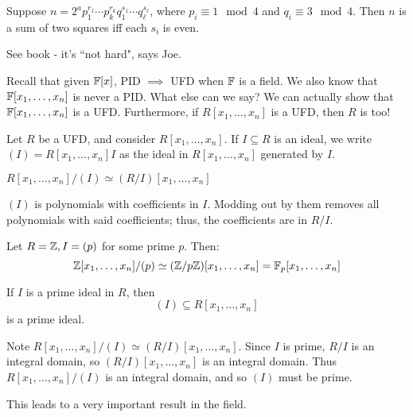 \begin{thm}
    Suppose $ n = 2^{a}p_{1}^{r_{1}}\cdots p_{k}^{r_{k}}q_{1}^{s_{1}}\cdots q_{\ell}^{s_{\ell}} $,
    where $ p_{i} \equiv 1 \mod 4 $ and $ q_{i} \equiv 3 \mod 4 $.
    Then $ n $ is a sum of two squares iff each $ s_{i} $ is even.
\end{thm}

\begin{pf}[source=Primary Source Material]
    See book - it's ``not hard", says Joe.
\end{pf}


Recall that given $ \mathbb{F}[x] $, PID $ \implies $ UFD when $ \mathbb{F} $ is a field.
We also know that $ \mathbb{F}[x_{1}, \dots, x_{n}] $ is never a PID. What else can we say?
We can actually show that $ \mathbb{F}[x_{1},\dots,x_{n}] $ is a UFD. Furthermore, if
$ R[x_{1},\dots,x_{n}] $ is a UFD, then $ R $ is too!

\begin{defn}
    Let $ R $ be a UFD, and consider $ R[x_{1},\dots,x_{n}] $. If $ I \subseteq R $ is
    an ideal, we write $ (I) = R[x_{1},\dots,x_{n}]I $ as the ideal in $ R[x_{1},\dots,x_{n}] $
    generated by $ I $.
\end{defn}

\begin{lm}
    $ R[x_{1},\dots,x_{n}]/(I) \simeq (R/I)[x_{1},\dots,x_{n}] $
\end{lm}
$ (I) $ is polynomials with coefficients in $ I $. Modding out by them removes all polynomials
with said coefficients; thus, the coefficients are in $ R/I $.

\begin{xmp}[source=Primary Source Material]
    Let $ R = \mathbb{Z}, I = (p) $ for some prime $ p $. Then:
    \begin{equation*}
        \mathbb{Z}[x_{1},\dots,x_{n}]/(p) \simeq (\mathbb{Z}/p\mathbb{Z})[x_{1},\dots,x_{n}]
        = \mathbb{F}_{p}[x_{1},\dots,x_{n}]
    \end{equation*}
\end{xmp}

\begin{thm}
    If $ I $ is a prime ideal in $ R $, then
    \begin{equation*}
        (I) \subseteq R[x_{1},\dots,x_{n}]
    \end{equation*}
    is a prime ideal.
\end{thm}

\begin{pf}[source=Primary Source Material]
    Note $ R[x_{1},\dots,x_{n}]/(I) \simeq (R/I)[x_{1},\dots,x_{n}] $.
    Since $ I $ is prime, $ R/I $ is an integral domain, so $ (R/I)[x_{1},\dots,x_{n}] $ is an
    integral domain. Thus $ R[x_{1},\dots,x_{n}]/(I) $ is an integral domain, and so $ (I) $ must
    be prime.
\end{pf}
This leads to a very important result in the field.

